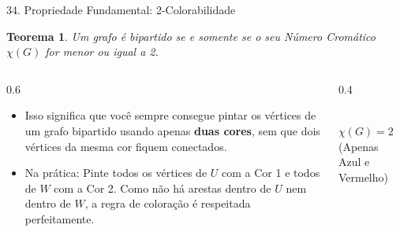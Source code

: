 \documentclass[9pt]{beamer}
\newtheorem{teorema}{Teorema}\usepackage{mathtools}
\begin{document}
    \begin{frame}{34. Propriedade Fundamental: 2-Colorabilidade}
        \begin{teorema}
            Um grafo é bipartido se e somente se o seu Número Cromático $\chi(G)$ for menor ou igual a 2.
        \end{teorema}
        \vspace{0.3cm}
        \begin{columns}
            \begin{column}{0.6\textwidth}
                \begin{itemize}
                    \item Isso significa que você sempre consegue pintar os vértices de um grafo bipartido usando apenas \textbf{duas cores}, sem que dois vértices da mesma cor fiquem conectados.
                    \item Na prática: Pinte todos os vértices de $U$ com a Cor 1 e todos de $W$ com a Cor 2. Como não há arestas dentro de $U$ nem dentro de $W$, a regra de coloração é respeitada perfeitamente.
                \end{itemize}
            \end{column}
            \begin{column}{0.4\textwidth}
                \centering
                \\
                \vspace{0.2cm}
                \tiny $\chi(G) = 2$ (Apenas Azul e Vermelho)
            \end{column}
        \end{columns}
    \end{frame}
\end{document}
